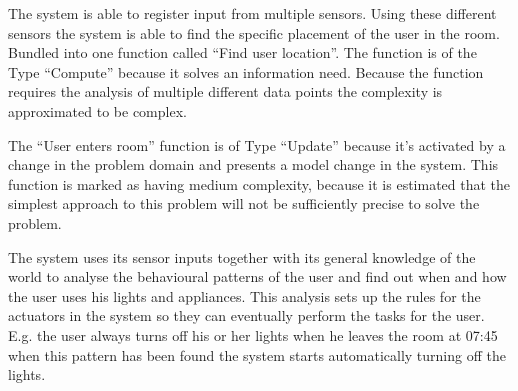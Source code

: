 The system is able to register input from multiple sensors. Using these different sensors the system is able to find the specific placement of the user in the room. Bundled into one function called \enquote{Find user location}. The function is of the Type \enquote{Compute} because it solves an information need. Because the function requires the analysis of multiple different data points the complexity is approximated to be complex.

The \enquote{User enters room} function is of Type \enquote{Update} because it's activated by a change in the problem domain and presents a model change in the system. This function is marked as having medium complexity, because it is estimated that the simplest approach to this problem will not be sufficiently precise to solve the problem.

The system uses its sensor inputs together with its general knowledge of the world to analyse the behavioural patterns of the user and find out when and how the user uses his lights and appliances. This analysis sets up the rules for the actuators in the system so they can eventually perform the tasks for the user. E.g. the user always turns off his or her lights when he leaves the room at 07:45 when this pattern has been found the system starts automatically turning off the lights.
